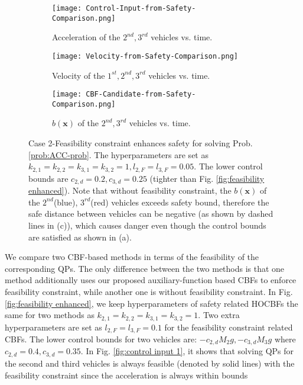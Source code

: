 \documentclass[letterpaper, 10 pt, conference]{ieeeconf}
\theoremstyle{definition}
\begin{document}
\begin{figure*}[t]
    \centering
    \begin{subfigure}[t]{0.32\linewidth}
        \centering
        \texttt{[image: Control-Input-from-Safety-Comparison.png]}
        \caption{Acceleration of the $2^{nd},3^{rd}$ vehicles vs. time.}
        \label{fig:control input 2}
    \end{subfigure}
    \begin{subfigure}[t]{0.32\linewidth}
        \centering
        \texttt{[image: Velocity-from-Safety-Comparison.png]}
        \caption{Velocity of the $1^{st},2^{nd},3^{rd}$ vehicles vs. time.}
        \label{fig:velocity 2}
    \end{subfigure}  
    \begin{subfigure}[t]{0.32\linewidth}
        \centering
        \texttt{[image: CBF-Candidate-from-Safety-Comparison.png]}
        \caption{$b(\boldsymbol{x})$ of the $2^{nd},3^{rd}$ vehicles vs. time.}
        \label{fig:distance 2}
    \end{subfigure}
    \caption{Case 2-Feasibility constraint enhances safety for solving Prob. \ref{prob:ACC-prob}. The hyperparameters are set as $k_{2,1}=k_{2,2}=k_{3,1}=k_{3,2}=1,l_{2,F}=l_{3,F}=0.05.$ The lower control bounds are $c_{2,d}=0.2,c_{3,d}=0.25$ (tighter than Fig. \ref{fig:feasibility enhanced}). Note that without feasibility constraint, the $b(\boldsymbol{x})$ of the $2^{nd}$(blue), $3^{rd}$(red) vehicles exceeds safety bound, therefore the safe distance between vehicles can be negative (as shown by dashed lines in (c)), which causes danger even though the control bounds are satisfied as shown in (a).} 
    \label{fig:safety enhanced}
\end{figure*}
We compare two CBF-based methods in terms of the feasibility of the corresponding QPs. The only difference between the two methods is that one method additionally uses our proposed auxiliary-function based CBFs to enforce feasibility constraint, while another one is without feasibility constraint. In Fig. \ref{fig:feasibility enhanced}, we keep hyperparameters of safety related HOCBFs the same for two methods as $k_{2,1}=k_{2,2}=k_{3,1}=k_{3,2}=1.$ Two extra hyperparameters are set as $l_{2,F}=l_{3,F}=0.1$ for the feasibility constraint related CBFs. The lower control bounds for two vehicles are: $-c_{2,d}M_{2}g, -c_{3,d}M_{3}g$ where $c_{2,d}=0.4,c_{3,d}=0.35.$ In Fig. \ref{fig:control input 1}, it shows that solving QPs for the second and third vehicles is always feasible (denoted by solid lines) with the feasibility constraint since the acceleration is always within bounds
\end{document}
